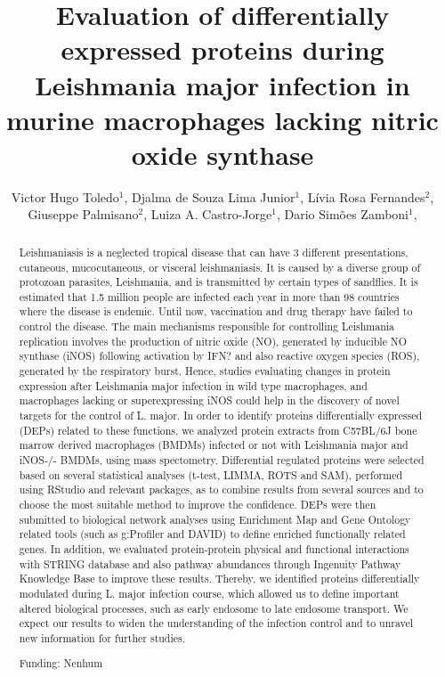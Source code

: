 \documentclass[twoside]{article}
\title{\vspace{-15mm}\fontsize{24pt}{10pt}\selectfont\textbf{ Evaluation of differentially expressed proteins during Leishmania major infection in murine macrophages lacking nitric oxide synthase }} %
\author{ Victor Hugo Toledo$^{1}$, Djalma de Souza Lima Junior$^{1}$, Lívia Rosa Fernandes$^{2}$, Giuseppe Palmisano$^{2}$, Luiza A. Castro-Jorge$^{1}$, Dario Simões Zamboni$^{1}$, }
\affil{ 1 Faculdade de Medicina de Ribeirão Preto - Universidade de São Paulo

2 Instituto de Ciências Biomédicas - Universidade de São Paulo

 }
\date{}
\begin{document}
  
  
  \maketitle %
  
  
  \thispagestyle{fancy} %
  
  
  \begin{abstract}
  Leishmaniasis is a neglected tropical disease that can have 3 different presentations, cutaneous, mucocutaneous, or visceral leishmaniasis. It is caused by a diverse group of protozoan parasites, Leishmania, and is transmitted by certain types of sandflies. It is estimated that 1.5 million people are infected each year in more than 98 countries where the disease is endemic. Until now, vaccination and drug therapy have failed to control the disease. The main mechanisms responsible for controlling Leishmania replication involves the production of nitric oxide (NO), generated by inducible NO synthase (iNOS) following activation by IFN? and also reactive oxygen species (ROS), generated by the respiratory burst. Hence, studies evaluating changes in protein expression after Leishmania major infection in wild type macrophages, and macrophages lacking or superexpressing iNOS could help in the discovery of novel targets for the control of L. major. In order to identify proteins differentially expressed (DEPs) related to these functions, we analyzed protein extracts from C57BL/6J bone marrow derived macrophages (BMDMs) infected or not with Leishmania major and iNOS-/- BMDMs, using mass spectometry. Differential regulated proteins were selected based on several statistical analyses (t-test, LIMMA, ROTS and SAM), performed using RStudio and relevant packages, as to combine results from several sources and to choose the most suitable method to improve the confidence. DEPs were then submitted to biological network analyses using Enrichment Map and Gene Ontology related tools (such as g:Profiler and DAVID)  to define enriched functionally related genes. In addition, we evaluated protein-protein physical and functional interactions with STRING database and also pathway abundances through Ingenuity Pathway Knowledge Base to improve these results. Thereby, we identified proteins differentially modulated during L. major infection course, which allowed us to define important altered biological processes, such as early endosome to late endosome transport. We expect our results to widen the understanding of the infection control and to unravel new information for further studies.
  
  Funding: Nenhum \\ 
  \end{abstract}
  
\end{document}
